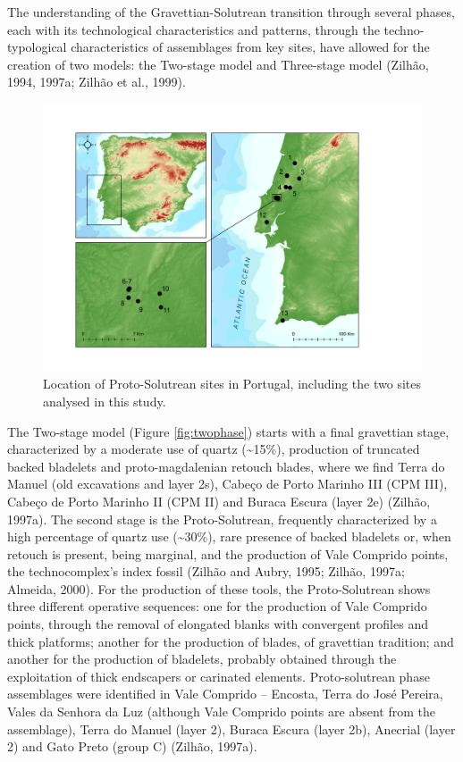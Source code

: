 \documentclass[12pt,twoside]{reedthesis}
\begin{document}
The understanding of the Gravettian-Solutrean transition through several phases, each with its technological characteristics and patterns, through the techno-typological characteristics of assemblages from key sites, have allowed for the creation of two models: the Two-stage model and Three-stage model (Zilhão, 1994, 1997a; Zilhão et al., 1999).
\begin{figure}[H]

{\centering \includegraphics[width=0.8\linewidth]{figure/map_proto_solutrean} 

}

\caption{Location of Proto-Solutrean sites in Portugal, including the two sites analysed in this study.}\label{fig:protomap}
\end{figure}
The Two-stage model (Figure \ref{fig:twophase}) starts with a final gravettian stage, characterized by a moderate use of quartz (\textasciitilde15\%), production of truncated backed bladelets and proto-magdalenian retouch blades, where we find Terra do Manuel (old excavations and layer 2s), Cabeço de Porto Marinho III (CPM III), Cabeço de Porto Marinho II (CPM II) and Buraca Escura (layer 2e) (Zilhão, 1997a). The second stage is the Proto-Solutrean, frequently characterized by a high percentage of quartz use (\textasciitilde30\%), rare presence of backed bladelets or, when retouch is present, being marginal, and the production of Vale Comprido points, the technocomplex's index fossil (Zilhão and Aubry, 1995; Zilhão, 1997a; Almeida, 2000). For the production of these tools, the Proto-Solutrean shows three different operative sequences: one for the production of Vale Comprido points, through the removal of elongated blanks with convergent profiles and thick platforms; another for the production of blades, of gravettian tradition; and another for the production of bladelets, probably obtained through the exploitation of thick endscapers or carinated elements. Proto-solutrean phase assemblages were identified in Vale Comprido -- Encosta, Terra do José Pereira, Vales da Senhora da Luz (although Vale Comprido points are absent from the assemblage), Terra do Manuel (layer 2), Buraca Escura (layer 2b), Anecrial (layer 2) and Gato Preto (group C) (Zilhão, 1997a).
\end{document}
